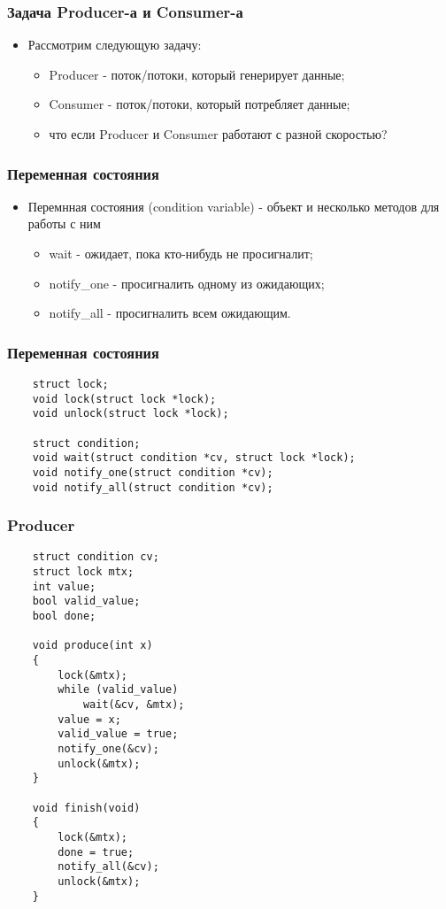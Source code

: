 \begin{frame}
\frametitle{Задача Producer-а и Consumer-а}
\begin{itemize}
    \item<1->Рассмотрим следующую задачу:
    \begin{itemize}
        \item<2->Producer - поток/потоки, который генерирует данные;
        \item<3->Consumer - поток/потоки, который потребляет данные;
        \item<4->что если Producer и Consumer работают с разной скоростью?
    \end{itemize}
\end{itemize}
\end{frame}

\begin{frame}
\frametitle{Переменная состояния}
\begin{itemize}
    \item<1->Перемнная состояния (condition variable) - объект и несколько
         методов для работы с ним
    \begin{itemize}
        \item<2->wait - ожидает, пока кто-нибудь не просигналит;
        \item<3->notify\_one - просигналить одному из ожидающих;
        \item<4->notify\_all - просигналить всем ожидающим.
    \end{itemize}
\end{itemize}
\end{frame}

\begin{frame}[fragile]
\frametitle{Переменная состояния}
\begin{lstlisting}
    struct lock;
    void lock(struct lock *lock);
    void unlock(struct lock *lock);

    struct condition;
    void wait(struct condition *cv, struct lock *lock);
    void notify_one(struct condition *cv);
    void notify_all(struct condition *cv);
\end{lstlisting}
\end{frame}

\begin{frame}[fragile]
\frametitle{Producer}
\begin{lstlisting}
    struct condition cv;
    struct lock mtx;
    int value;
    bool valid_value;
    bool done;

    void produce(int x)
    {
        lock(&mtx);
        while (valid_value)
            wait(&cv, &mtx);
        value = x;
        valid_value = true;
        notify_one(&cv);
        unlock(&mtx);
    }

    void finish(void)
    {
        lock(&mtx);
        done = true;
        notify_all(&cv);
        unlock(&mtx);
    }
\end{lstlisting}
\end{frame}

